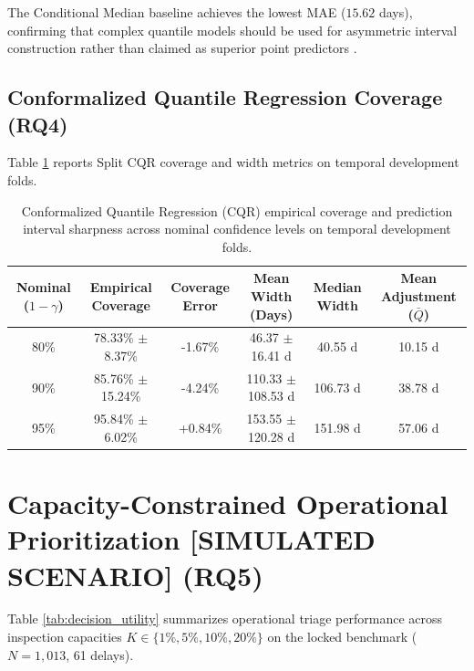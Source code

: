 \documentclass[11pt,a4paper]{article}
\begin{document}
The Conditional Median baseline achieves the lowest MAE ($15.62$ days), confirming that complex quantile models should be used for asymmetric interval construction rather than claimed as superior point predictors \cite{simchilevi2014superstorms}.

\subsection{Conformalized Quantile Regression Coverage (RQ4)}
Table \ref{tab:cqr_benchmark} reports Split CQR coverage and width metrics on temporal development folds.

\begin{table}[htbp]
\centering
\caption{Conformalized Quantile Regression (CQR) empirical coverage and prediction interval sharpness across nominal confidence levels on temporal development folds.}
\label{tab:cqr_benchmark}
\small
\begin{tabular}{cccccc}
\toprule
\textbf{Nominal ($1-\gamma$)} & \textbf{Empirical Coverage} & \textbf{Coverage Error} & \textbf{Mean Width (Days)} & \textbf{Median Width} & \textbf{Mean Adjustment ($\bar{Q}$)} \\
\midrule
80\% & 78.33\% $\pm$ 8.37\% & -1.67\% & 46.37 $\pm$ 16.41 d & 40.55 d & 10.15 d \\
90\% & 85.76\% $\pm$ 15.24\% & -4.24\% & 110.33 $\pm$ 108.53 d & 106.73 d & 38.78 d \\
95\% & 95.84\% $\pm$ 6.02\% & +0.84\% & 153.55 $\pm$ 120.28 d & 151.98 d & 57.06 d \\
\bottomrule
\end{tabular}
\end{table}

\section{Capacity-Constrained Operational Prioritization [SIMULATED SCENARIO] (RQ5)}
Table \ref{tab:decision_utility} summarizes operational triage performance across inspection capacities $K \in \{1\%, 5\%, 10\%, 20\%\}$ on the locked benchmark ($N=1,013$, 61 delays).
\end{document}

